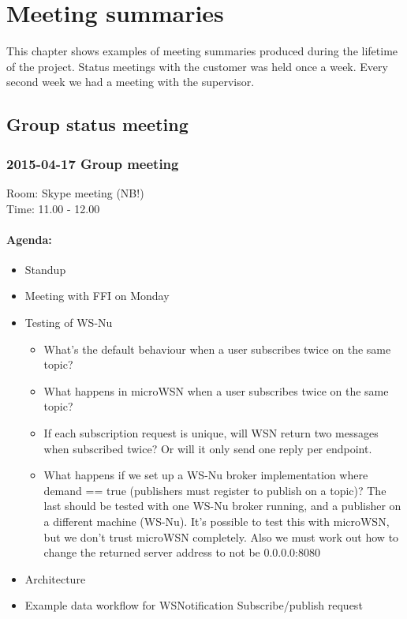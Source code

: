 \chapter{Meeting summaries}
\label{appendix-meeting_summaries}

This chapter shows examples of meeting summaries produced during the lifetime of the project. Status meetings with the customer was held once a week. Every second week we had a meeting with the supervisor.

\section{Group status meeting}

\subsection*{2015-04-17 Group meeting}
Room: Skype meeting (NB!) \\
\noindent Time: 11.00 - 12.00

\subsubsection*{Agenda:}
\begin{itemize}
\setlength{\itemsep}{0cm}%
\item Standup
\item Meeting with FFI on Monday
\item Testing of WS-Nu \begin{itemize}
\setlength{\itemsep}{0cm}%
\item What’s the default behaviour when a user subscribes twice on the same topic?
\item What happens in microWSN when a user subscribes twice on the same topic?
\item If each subscription request is unique, will WSN return two messages when subscribed twice? Or will it only send one reply per endpoint. 
\item What happens if we set up a WS-Nu broker implementation where demand == true (publishers must register to publish on a topic)? The last should be tested with one WS-Nu broker running, and a publisher on a different machine (WS-Nu). It’s possible to test this with microWSN, but we don’t trust microWSN completely. Also we must work out how to change the returned server address to not be 0.0.0.0:8080 
\end{itemize}
\item Architecture 
\item Example data workflow for WSNotification Subscribe/publish request
\end{itemize}

